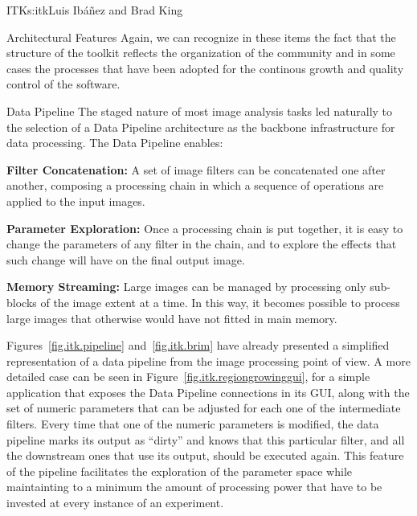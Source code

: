 \begin{aosachapter}{ITK}{s:itk}{Luis Ib\'{a}\~{n}ez and Brad King}
\begin{aosasect1}{Architectural Features}
Again, we can recognize in these items the fact that the structure of the
toolkit reflects the organization of the community and in some cases the
processes that have been adopted for the continous growth and quality control
of the software.

\begin{aosasect2}{Data Pipeline}
The staged nature of most image analysis tasks led naturally to the selection
of a Data Pipeline architecture as the backbone infrastructure for data
processing. The Data Pipeline enables:

\begin{aosaitemize}

\item \textbf{Filter Concatenation:} A set of image filters can be concatenated
one after another, composing a processing chain in which a sequence of
operations are applied to the input images.

\item \textbf{Parameter Exploration:} Once a processing chain is put together,
it is easy to change the parameters of any filter in the chain, and to explore
the effects that such change will have on the final output image.

\item \textbf{Memory Streaming:} Large images can be managed by processing only
sub-blocks of the image extent at a time. In this way, it becomes possible to
process large images that otherwise would have not fitted in main memory.

\end{aosaitemize}


Figures~\ref{fig.itk.pipeline} and~\ref{fig.itk.brim} have already presented a
simplified representation of a data pipeline from the image processing point of
view. A more detailed case can be seen in
Figure~\ref{fig.itk.regiongrowinggui}, for a simple application that exposes
the Data Pipeline connections in its GUI, along with the set of numeric
parameters that can be adjusted for each one of the intermediate filters. Every
time that one of the numeric parameters is modified, the data pipeline marks
its output as ``dirty'' and knows that this particular filter, and all the
downstream ones that use its output, should be executed again. This feature of
the pipeline facilitates the exploration of the parameter space while
maintainting to a minimum the amount of processing power that have to be
invested at every instance of an experiment.


\end{aosasect2}
\end{aosasect1}
\end{aosachapter}
